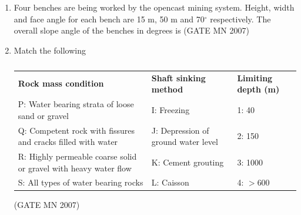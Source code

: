 \documentclass[journal]{IEEEtran}
\begin{document}
\begin{enumerate}
\item Four benches are being worked by the opencast mining system. Height, width and face angle for each bench are 15 m, 50 m and 70$^\circ$ respectively. The overall slope angle of the benches in degrees is  
	\hfill (GATE MN 2007)
\begin{enumerate}
\end{enumerate}


\item Match the following
\begin{table}[H]
    \centering\normalsize
\begin{tabular}{p{4.5cm} p{4.5cm} p{4cm}}
\textbf{Rock mass condition} & \textbf{Shaft sinking method} & \textbf{Limiting depth (m)} \\
P: Water bearing strata of loose sand or gravel & I: Freezing & 1: 40 \\
Q: Competent rock with fissures and cracks filled with water & J: Depression of ground water level & 2: 150 \\
R: Highly permeable coarse solid or gravel with heavy water flow & K: Cement grouting & 3: 1000 \\
S: All types of water bearing rocks & L: Caisson & 4: $>$600 \\
\end{tabular}
\caption{}
    \label{tab:Q47}
\end{table}
\hfill (GATE MN 2007)
\begin{enumerate}
\end{enumerate}



\end{enumerate}
\end{document}
